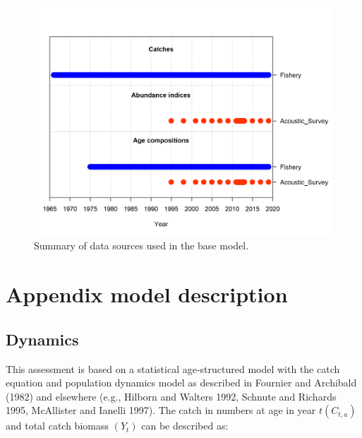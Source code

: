 \documentclass[11pt,
  english,
  a4paper,
]{article}
\begin{document}
\begin{figure}
\centering
\includegraphics[width=1\textwidth,height=1\textheight]{data-plot.png}
\caption{Summary of data sources used in the base model.\label{fig:data-plot}}
\end{figure}

\tagmcend\tagstructend


\hypertarget{appendix-model-description}{%
\section{Appendix model description}\label{appendix-model-description}}

\leavevmode\tagmcend\tagstructend


\hypertarget{dynamics}{%
\subsection{Dynamics}\label{dynamics}}

\leavevmode\tagmcend\tagstructend


This assessment is based on a statistical age-structured model with the catch equation and population dynamics model as described in Fournier and Archibald (1982) and elsewhere (e.g., Hilborn and Walters 1992, Schnute and Richards 1995, McAllister and Ianelli 1997). The catch in numbers at age in year {\(t (C_{t,a})\)\leavevmode\tagmcend\tagstructend} and total catch biomass {\((Y_t)\)\leavevmode\tagmcend\tagstructend} can be described as:
\end{document}

